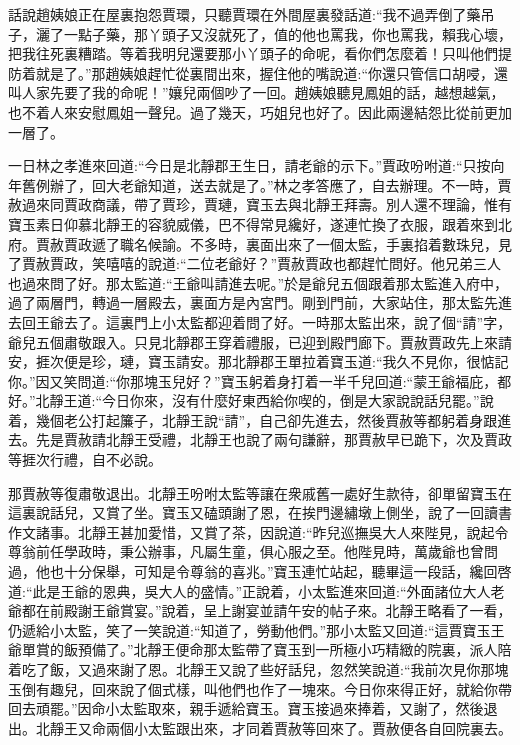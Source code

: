 


\begin{parag}
    話說趙姨娘正在屋裏抱怨賈環，只聽賈環在外間屋裏發話道:“我不過弄倒了藥吊子，灑了一點子藥，那丫頭子又沒就死了，值的他也罵我，你也罵我，賴我心壞，把我往死裏糟踏。等着我明兒還要那小丫頭子的命呢，看你們怎麼着！只叫他們提防着就是了。”那趙姨娘趕忙從裏間出來，握住他的嘴說道:“你還只管信口胡唚，還叫人家先要了我的命呢！”孃兒兩個吵了一回。趙姨娘聽見鳳姐的話，越想越氣，也不着人來安慰鳳姐一聲兒。過了幾天，巧姐兒也好了。因此兩邊結怨比從前更加一層了。
\end{parag}


\begin{parag}
    一日林之孝進來回道:“今日是北靜郡王生日，請老爺的示下。”賈政吩咐道:“只按向年舊例辦了，回大老爺知道，送去就是了。”林之孝答應了，自去辦理。不一時，賈赦過來同賈政商議，帶了賈珍，賈璉，寶玉去與北靜王拜壽。別人還不理論，惟有寶玉素日仰慕北靜王的容貌威儀，巴不得常見纔好，遂連忙換了衣服，跟着來到北府。賈赦賈政遞了職名候諭。不多時，裏面出來了一個太監，手裏掐着數珠兒，見了賈赦賈政，笑嘻嘻的說道:“二位老爺好？”賈赦賈政也都趕忙問好。他兄弟三人也過來問了好。那太監道:“王爺叫請進去呢。”於是爺兒五個跟着那太監進入府中，過了兩層門，轉過一層殿去，裏面方是內宮門。剛到門前，大家站住，那太監先進去回王爺去了。這裏門上小太監都迎着問了好。一時那太監出來，說了個“請”字，爺兒五個肅敬跟入。只見北靜郡王穿着禮服，已迎到殿門廊下。賈赦賈政先上來請安，捱次便是珍，璉，寶玉請安。那北靜郡王單拉着寶玉道:“我久不見你，很惦記你。”因又笑問道:“你那塊玉兒好？”寶玉躬着身打着一半千兒回道:“蒙王爺福庇，都好。”北靜王道:“今日你來，沒有什麼好東西給你喫的，倒是大家說說話兒罷。”說着，幾個老公打起簾子，北靜王說“請”，自己卻先進去，然後賈赦等都躬着身跟進去。先是賈赦請北靜王受禮，北靜王也說了兩句謙辭，那賈赦早已跪下，次及賈政等捱次行禮，自不必說。
\end{parag}


\begin{parag}
    那賈赦等復肅敬退出。北靜王吩咐太監等讓在衆戚舊一處好生款待，卻單留寶玉在這裏說話兒，又賞了坐。寶玉又磕頭謝了恩，在挨門邊繡墩上側坐，說了一回讀書作文諸事。北靜王甚加愛惜，又賞了茶，因說道:“昨兒巡撫吳大人來陛見，說起令尊翁前任學政時，秉公辦事，凡屬生童，俱心服之至。他陛見時，萬歲爺也曾問過，他也十分保舉，可知是令尊翁的喜兆。”寶玉連忙站起，聽畢這一段話，纔回啓道:“此是王爺的恩典，吳大人的盛情。”正說着，小太監進來回道:“外面諸位大人老爺都在前殿謝王爺賞宴。”說着，呈上謝宴並請午安的帖子來。北靜王略看了一看，仍遞給小太監，笑了一笑說道:“知道了，勞動他們。”那小太監又回道:“這賈寶玉王爺單賞的飯預備了。”北靜王便命那太監帶了寶玉到一所極小巧精緻的院裏，派人陪着吃了飯，又過來謝了恩。北靜王又說了些好話兒，忽然笑說道:“我前次見你那塊玉倒有趣兒，回來說了個式樣，叫他們也作了一塊來。今日你來得正好，就給你帶回去頑罷。”因命小太監取來，親手遞給寶玉。寶玉接過來捧着，又謝了，然後退出。北靜王又命兩個小太監跟出來，才同着賈赦等回來了。賈赦便各自回院裏去。
\end{parag}


